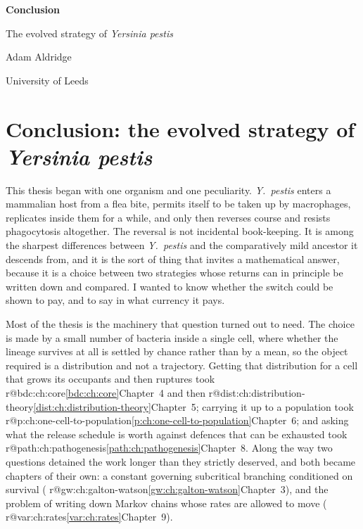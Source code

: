\documentclass[11pt,a4paper]{report}
\makeatletter
\newcommand{\yp}{\textit{Y.~pestis}}
\providecommand{\mextref}[2]{%
  \ifcsname r@#1\endcsname\cref{#1}\else#2\fi}
\theoremstyle{plain}
\theoremstyle{remark}
\makeatother
\begin{document}
\hypersetup{pageanchor=false}
\begin{titlepage}
\centering
\vspace*{4cm}
{\LARGE\bfseries Conclusion\par}
\vspace{6pt}
{\large The evolved strategy of \textit{Yersinia pestis}\par}
\vspace{2.5cm}
{\large Adam Aldridge\par}
\vspace{4pt}
{University of Leeds\par}
\end{titlepage}
\hypersetup{pageanchor=true}

\tableofcontents
\clearpage

\setcounter{chapter}{9}   %

\chapter[Conclusion]{Conclusion: the evolved strategy of
\texorpdfstring{\textit{Yersinia pestis}}{Yersinia pestis}}
\label{ch:conclusion}

This thesis began with one organism and one peculiarity. \yp{} enters a
mammalian host from a flea bite, permits itself to be taken up by
macrophages, replicates inside them for a while, and only then reverses
course and resists phagocytosis altogether. The reversal is not incidental
book-keeping. It is among the sharpest differences between \yp{} and the
comparatively mild ancestor it descends from, and it is the sort of thing
that invites a mathematical answer, because it is a choice between two
strategies whose returns can in principle be written down and compared. I
wanted to know whether the switch could be shown to pay, and to say in what
currency it pays.

Most of the thesis is the machinery that question turned out to need. The
choice is made by a small number of bacteria inside a single cell, where
whether the lineage survives at all is settled by chance rather than by a
mean, so the object required is a distribution and not a trajectory. Getting
that distribution for a cell that grows its occupants and then ruptures took
\mextref{bdc:ch:core}{Chapter~4} and then
\mextref{dist:ch:distribution-theory}{Chapter~5}; carrying it up to a
population took \mextref{p:ch:one-cell-to-population}{Chapter~6}; and asking
what the release schedule is worth against defences that can be exhausted
took \mextref{path:ch:pathogenesis}{Chapter~8}. Along the way two questions
detained the work longer than they strictly deserved, and both became
chapters of their own: a constant governing subcritical branching
conditioned on survival (\mextref{gw:ch:galton-watson}{Chapter~3}), and the problem of writing down
Markov chains whose rates are allowed to move
(\mextref{var:ch:rates}{Chapter~9}).
\end{document}
